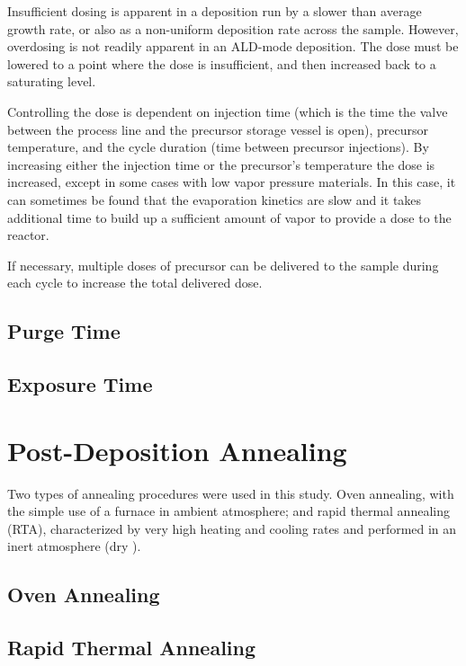 Insufficient dosing is apparent in a deposition run by a slower than average growth rate, or also as a non-uniform deposition rate across the sample. However, overdosing is not readily apparent in an ALD-mode deposition. The dose must be lowered to a point where the dose is insufficient, and then increased back to a saturating level. 

Controlling the dose is dependent on injection time (which is the time the valve between the process line and the precursor storage vessel is open), precursor temperature, and the cycle duration (time between precursor injections). By increasing either the injection time or the precursor's temperature the dose is increased, except in some cases with low vapor pressure materials. In this case, it can sometimes be found that the evaporation kinetics are slow and it takes additional time to build up a sufficient amount of vapor to provide a dose to the reactor. 

If necessary, multiple doses of precursor can be delivered to the sample during each cycle to increase the total delivered dose.


\subsection{Purge Time}

\lipsum


\subsection{Exposure Time}

\lipsum


\section{Post-Deposition Annealing}
\label{sec:SampFab-Annealing}

Two types of annealing procedures were used in this study. Oven annealing, with the simple use of a furnace in ambient atmosphere; and rapid thermal annealing (RTA), characterized by very high heating and cooling rates and performed in an inert atmosphere (dry ). 



\subsection{Oven Annealing}




\subsection{Rapid Thermal Annealing}







